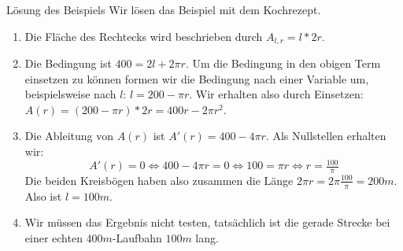 \begin{bla}{Lösung des Beispiels}
  Wir lösen das Beispiel mit dem Kochrezept.
  \begin{enumerate}
    \item Die Fläche des Rechtecks wird beschrieben durch $A_{l,r}=l*2r$.
    \item Die Bedingung ist $400=2l+2\pi r$. Um die Bedingung in den obigen Term einsetzen zu können formen wir die Bedingung nach einer Variable um, beispielsweise nach $l$: $l=200-\pi r$. Wir erhalten also durch Einsetzen: $A(r)=(200-\pi r)*2r=400r-2\pi r^2$.
    \item Die Ableitung von $A(r)$ ist $A'(r)=400-4\pi r$. Als Nullstellen erhalten wir:
    \begin{equation*}
      A'(r)=0 \Leftrightarrow 400-4\pi r = 0 \Leftrightarrow 100=\pi r \Leftrightarrow r = \tfrac{100}{\pi}
    \end{equation*}
    Die beiden Kreisbögen haben also zusammen die Länge $2\pi r = 2\pi \tfrac{100}{\pi} = 200m$. Also ist $l=100m$.
    \item Wir müssen das Ergebnis nicht testen, tatsächlich ist die gerade Strecke bei einer echten $400m$-Laufbahn $100m$ lang.
  \end{enumerate}
\end{bla}
